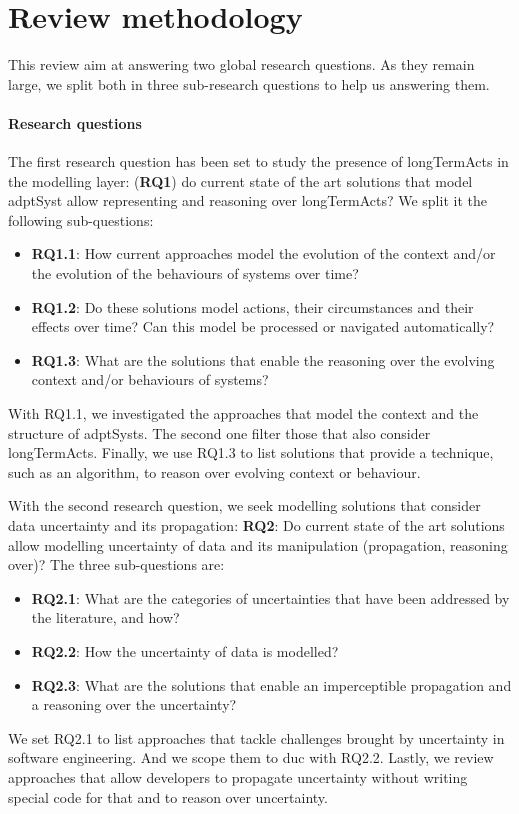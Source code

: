 \section{Review methodology}
\label{sec:sota:methodo}

This review aim at answering two global research questions.
As they remain large, we split both in three sub-research questions to help us answering them.

\paragraph{Research questions}
The first research question has been set to study the presence of \glspl{longTermAct} in the modelling layer: (\textbf{RQ1}) do current state of the art solutions that model \gls{adptSyst} allow representing and reasoning over \glspl{longTermAct}?
We split it the following sub-questions:
\begin{itemize}
	\item \textbf{RQ1.1}: How current approaches model the evolution of the context and/or the evolution of the behaviours of systems over time?
	\item \textbf{RQ1.2}: Do these solutions model actions, their circumstances and their effects over time? Can this model be processed or navigated automatically?
	\item \textbf{RQ1.3}: What are the solutions that enable the reasoning over the evolving context and/or behaviours of systems?
\end{itemize}
With RQ1.1, we investigated the approaches that model the context and the structure of \glspl{adptSyst}.
The second one filter those that also consider \glspl{longTermAct}.
Finally, we use RQ1.3 to list solutions that provide a technique, such as an algorithm, to reason over evolving context or behaviour.

With the second research question, we seek modelling solutions that consider data uncertainty and its propagation: \textbf{RQ2}: Do current state of the art solutions allow modelling uncertainty of data and its manipulation (propagation, reasoning over)?
The three sub-questions are:
\begin{itemize}
	\item \textbf{RQ2.1}: What are the categories of uncertainties that have been addressed by the literature, and how?
	\item \textbf{RQ2.2}: How the uncertainty of data is modelled?
	\item \textbf{RQ2.3}: What are the solutions that enable an imperceptible propagation and a reasoning over the uncertainty?
\end{itemize}
We set RQ2.1 to list approaches that tackle challenges brought by uncertainty in software engineering.
And we scope them to \gls{duc} with RQ2.2.
Lastly, we review approaches that allow developers to propagate uncertainty without writing special code for that and to reason over uncertainty.



